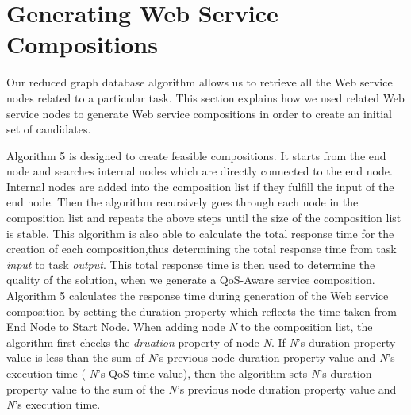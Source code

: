 \section{Generating Web Service Compositions} \label{generatingComp}
Our reduced graph database algorithm allows us to retrieve all the Web service nodes related to a particular task. This section explains how we used related Web service nodes to generate Web service compositions in order to create an initial set of candidates.\par

Algorithm 5 is designed to create feasible compositions. It starts from the end node and searches internal nodes which are directly connected to the end node. Internal nodes are added into the composition list if they fulfill the input of the end node. Then the algorithm recursively goes through each node in the composition list and repeats the above steps until the size of the composition list is stable. This algorithm is also able to calculate the total response time for the creation of each composition,thus determining the total response time from task \emph{input} to task \emph{output}. This total  response time is then used to determine the quality of the solution, when we generate a QoS-Aware service composition. Algorithm 5 calculates the response time during generation of the Web service composition by setting the duration property which reflects the time taken from End Node to Start Node. When adding node \emph{N} to the composition list, the algorithm first checks the \emph{druation} property of node \emph{N}. If \emph{N}'s duration property value is less than the sum of \emph{N}'s previous node  duration property value and  \emph{N}'s execution time ( \emph{N}'s QoS time value), then the algorithm sets  \emph{N}'s duration property value to the sum of the  \emph{N}'s previous node duration property value and  \emph{N}'s execution time.\par

